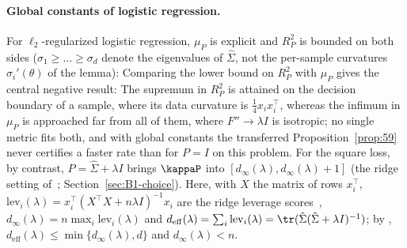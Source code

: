 \paragraph{Global constants of logistic regression.}
For $\ell_2$-regularized logistic regression, $\mu_P$ is explicit and $R_P^2$ is bounded on both sides
($\sigma_1\ge\dots\ge\sigma_d$ denote the eigenvalues of $\hat\Sigma$, not the per-sample curvatures
$\sigma_i'(\theta)$ of the lemma):
Comparing the lower bound on $R_P^2$ with $\mu_P$ gives the central negative result:
The supremum in $R_P^2$ is attained on the decision boundary of a sample, where its data curvature is
$\frac14x_ix_i^\top$, whereas the infimum in $\mu_P$ is approached far from all of them, where $F''\to\lambda I$ is
isotropic; no single metric fits both, and with global constants the transferred Proposition~\ref{prop:59} never
certifies a faster rate than for $P=I$ on this problem. For the square loss, by contrast, $P=\hat\Sigma+\lambda I$ brings
$\kappaP$ into $[d_\infty(\lambda),d_\infty(\lambda)+1]$ (the ridge setting of~\cite{gonen2016solving};
Section~\ref{sec:B1-choice}). Here, with $X$ the matrix of rows $x_i^\top$,
$\mathrm{lev}_i(\lambda)=x_i^\top(X^\top X+n\lambda I)^{-1}x_i$ are the ridge leverage
scores~\cite{elalaoui2015fast,bach2013sharp}, $d_\infty(\lambda)=n\max_i\mathrm{lev}_i(\lambda)$ and
$d_{\mathrm{eff}}(\lambda)=\sum_i\mathrm{lev}_i(\lambda)=\tr(\hat\Sigma(\hat\Sigma+\lambda I)^{-1})$; by
, $d_{\mathrm{eff}}(\lambda)\le\min\{d_\infty(\lambda),d\}$ and $d_\infty(\lambda)<n$.

